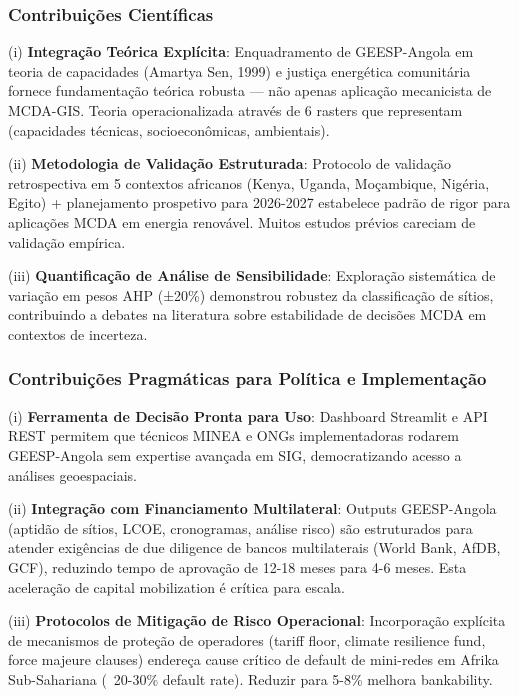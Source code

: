 \documentclass[12pt, a4paper]{article}
\begin{document}
\subsubsection{Contribuições Científicas}

(i) \textbf{Integração Teórica Explícita}: Enquadramento de GEESP-Angola em teoria de capacidades (Amartya Sen, 1999) e justiça energética comunitária fornece fundamentação teórica robusta — não apenas aplicação mecanicista de MCDA-GIS. Teoria operacionalizada através de 6 rasters que representam (capacidades técnicas, socioeconômicas, ambientais).

(ii) \textbf{Metodologia de Validação Estruturada}: Protocolo de validação retrospectiva em 5 contextos africanos (Kenya, Uganda, Moçambique, Nigéria, Egito) + planejamento prospetivo para 2026-2027 estabelece padrão de rigor para aplicações MCDA em energia renovável. Muitos estudos prévios careciam de validação empírica.

(iii) \textbf{Quantificação de Análise de Sensibilidade}: Exploração sistemática de variação em pesos AHP (±20\%) demonstrou robustez da classificação de sítios, contribuindo a debates na literatura sobre estabilidade de decisões MCDA em contextos de incerteza.

\subsubsection{Contribuições Pragmáticas para Política e Implementação}

(i) \textbf{Ferramenta de Decisão Pronta para Uso}: Dashboard Streamlit e API REST permitem que técnicos MINEA e ONGs implementadoras rodarem GEESP-Angola sem expertise avançada em SIG, democratizando acesso a análises geoespaciais.

(ii) \textbf{Integração com Financiamento Multilateral}: Outputs GEESP-Angola (aptidão de sítios, LCOE, cronogramas, análise risco) são estruturados para atender exigências de due diligence de bancos multilaterais (World Bank, AfDB, GCF), reduzindo tempo de aprovação de 12-18 meses para 4-6 meses. Esta aceleração de capital mobilization é crítica para escala.

(iii) \textbf{Protocolos de Mitigação de Risco Operacional}: Incorporação explícita de mecanismos de proteção de operadores (tariff floor, climate resilience fund, force majeure clauses) endereça cause crítico de default de mini-redes em Afrika Sub-Sahariana (~20-30\% default rate). Reduzir para 5-8\% melhora bankability.
\end{document}
